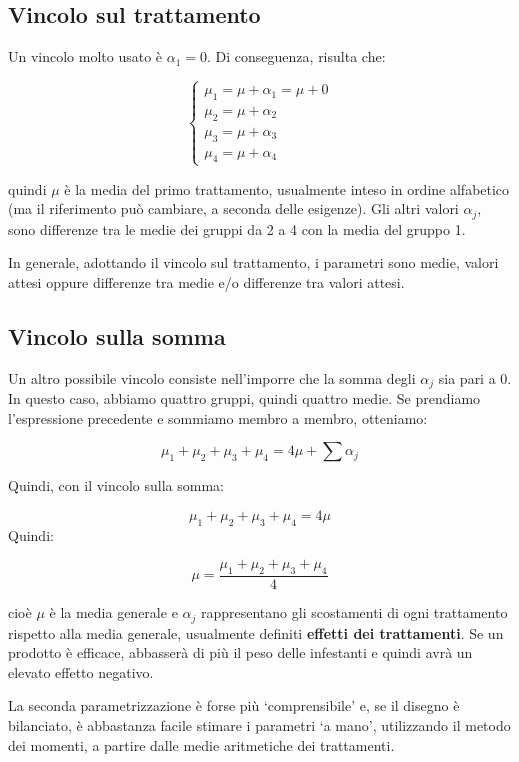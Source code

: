\documentclass[a4paper,12pt,oneside]{book}
\begin{document}
\hypertarget{vincolo-sul-trattamento}{%
\subsection{Vincolo sul trattamento}\label{vincolo-sul-trattamento}}

Un vincolo molto usato è \(\alpha_1 = 0\). Di conseguenza, risulta che:

\[ \left\{ {\begin{array}{l}
\mu_1 = \mu + \alpha_1 = \mu + 0\\
\mu_2 = \mu + \alpha_2 \\
\mu_3 = \mu + \alpha_3 \\
\mu_4 = \mu + \alpha_4
\end{array}} \right.\]

quindi \(\mu\) è la media del primo trattamento, usualmente inteso in ordine alfabetico (ma il riferimento può cambiare, a seconda delle esigenze). Gli altri valori \(\alpha_j\), sono differenze tra le medie dei gruppi da 2 a 4 con la media del gruppo 1.

In generale, adottando il vincolo sul trattamento, i parametri sono medie, valori attesi oppure differenze tra medie e/o differenze tra valori attesi.

\hypertarget{vincolo-sulla-somma}{%
\subsection{Vincolo sulla somma}\label{vincolo-sulla-somma}}

Un altro possibile vincolo consiste nell'imporre che la somma degli \(\alpha_j\) sia pari a 0. In questo caso, abbiamo quattro gruppi, quindi quattro medie. Se prendiamo l'espressione precedente e sommiamo membro a membro, otteniamo:

\[ \mu_1 + \mu_2 + \mu_3 + \mu_4 = 4 \mu + \sum{\alpha_j}\]

Quindi, con il vincolo sulla somma:

\[ \mu_1 + \mu_2 + \mu_3 + \mu_4 = 4 \mu\]
Quindi:

\[\mu = \frac{\mu_1 + \mu_2 + \mu_3 + \mu_4}{4} \]

cioè \(\mu\) è la media generale e \(\alpha_j\) rappresentano gli scostamenti di ogni trattamento rispetto alla media generale, usualmente definiti \textbf{effetti dei trattamenti}. Se un prodotto è efficace, abbasserà di più il peso delle infestanti e quindi avrà un elevato effetto negativo.

La seconda parametrizzazione è forse più `comprensibile' e, se il disegno è bilanciato, è abbastanza facile stimare i parametri `a mano', utilizzando il metodo dei momenti, a partire dalle medie aritmetiche dei trattamenti.
\end{document}
